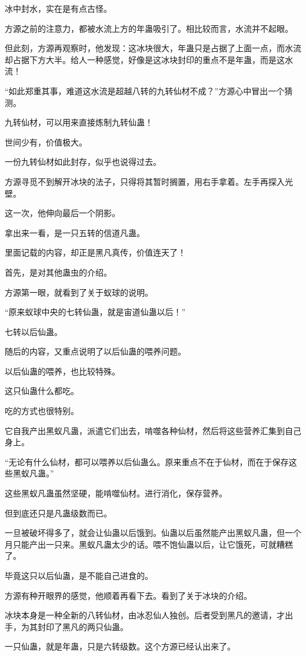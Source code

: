 \begin{this_body}
冰中封水，实在是有点古怪。

方源之前的注意力，都被水流上方的年蛊吸引了。相比较而言，水流并不起眼。

但此刻，方源再观察时，他发现：这冰块很大，年蛊只是占据了上面一点，而水流却占据下方大半。给人一种感觉，好像是这冰块封印的重点不是年蛊，而是这水流！

“如此郑重其事，难道这水流是超越八转的九转仙材不成？”方源心中冒出一个猜测。

九转仙材，可以用来直接炼制九转仙蛊！

世间少有，价值极大。

一份九转仙材如此封存，似乎也说得过去。

方源寻觅不到解开冰块的法子，只得将其暂时搁置，用右手拿着。左手再探入光壁。

这一次，他伸向最后一个阴影。

拿出来一看，是一只五转的信道凡蛊。

里面记载的内容，却正是黑凡真传，价值连天了！

首先，是对其他蛊虫的介绍。

方源第一眼，就看到了关于蚁球的说明。

“原来蚁球中央的七转仙蛊，就是宙道仙蛊以后！”

七转以后仙蛊。

随后的内容，又重点说明了以后仙蛊的喂养问题。

以后仙蛊的喂养，也比较特殊。

这只仙蛊什么都吃。

吃的方式也很特别。

它自我产出黑蚁凡蛊，派遣它们出去，啃噬各种仙材，然后将这些营养汇集到自己身上。

“无论有什么仙材，都可以喂养以后仙蛊么。原来重点不在于仙材，而在于保存这些黑蚁凡蛊。”

这些黑蚁凡蛊虽然坚硬，能啃噬仙材。进行消化，保存营养。

但到底还只是凡蛊级数而已。

一旦被破坏得多了，就会让仙蛊以后饿到。仙蛊以后虽然能产出黑蚁凡蛊，但一个月只能产出一只来。黑蚁凡蛊太少的话。喂不饱仙蛊以后，让它饿死，可就糟糕了。

毕竟这只以后仙蛊，是不能自己进食的。

方源有种开眼界的感觉，他顺着再看下去。看到了关于冰块的介绍。

冰块本身是一种全新的八转仙材，由冰忍仙人独创。后者受到黑凡的邀请，才出手，为其封印了黑凡的两只仙蛊。

一只仙蛊，就是年蛊，只是六转级数。这个方源已经认出来了。


\end{this_body}
